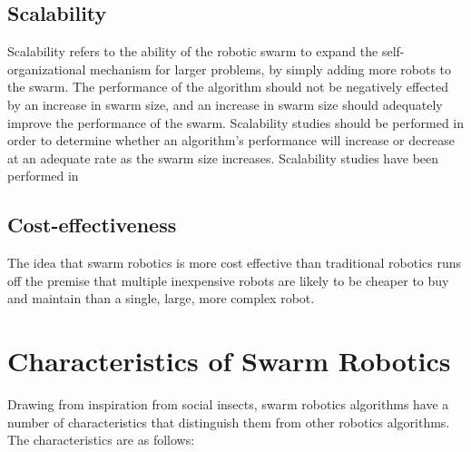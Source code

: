 \subsection{Scalability}
Scalability refers to the ability of the robotic swarm to expand the self-organizational mechanism for larger problems, by simply adding more robots to the swarm. The performance of the algorithm should not be negatively effected by an increase in swarm size, and an increase in swarm size should adequately improve the performance of the swarm. Scalability studies should be performed in order to determine whether an algorithm's performance will increase or decrease at an adequate rate as the swarm size increases. Scalability studies have been performed in \cite{bahgecci2005evolving,nouyan2008path,zarzhitsky2005distributed}

\subsection{Cost-effectiveness}
The idea that swarm robotics is more cost effective than traditional robotics runs off the premise that multiple inexpensive robots are likely to be cheaper to buy and maintain than a single, large, more complex robot. 

\section{Characteristics of Swarm Robotics}
\label{characteristics}

Drawing from inspiration from social insects, swarm robotics algorithms have a number of characteristics that distinguish them from other robotics algorithms. The characteristics are as follows:

